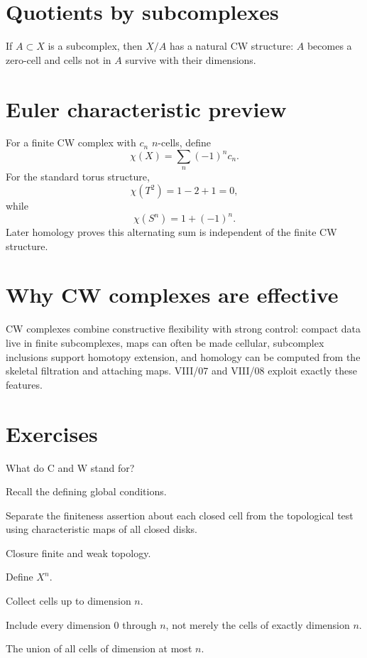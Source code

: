 \section{Quotients by subcomplexes}
\begin{proposition}[CW quotient]\label{prop:viii06-quotient}
If \(A\subset X\) is a subcomplex, then \(X/A\) has a natural CW structure:
\(A\) becomes a zero-cell and cells not in \(A\) survive with their dimensions.
\end{proposition}

\section{Euler characteristic preview}
For a finite CW complex with \(c_n\) \(n\)-cells, define
\[
\chi(X)=\sum_n(-1)^n c_n.
\]
For the standard torus structure,
\[
\chi(T^2)=1-2+1=0,
\]
while
\[
\chi(S^n)=1+(-1)^n.
\]
Later homology proves this alternating sum is independent of the finite CW
structure.

\section{Why CW complexes are effective}
CW complexes combine constructive flexibility with strong control: compact
data live in finite subcomplexes, maps can often be made cellular, subcomplex
inclusions support homotopy extension, and homology can be computed from the
skeletal filtration and attaching maps.  VIII/07 and VIII/08 exploit exactly
these features.


\section{Exercises}

\begin{exercise}\label{exr:viii06-01}
What do C and W stand for?
\end{exercise}
\begin{hint}
Recall the defining global conditions.

Separate the finiteness assertion about each closed cell from the topological test using characteristic maps of all closed disks.
\end{hint}
\begin{solution}
Closure finite and weak topology.
\end{solution}

\begin{exercise}\label{exr:viii06-02}
Define \(X^n\).
\end{exercise}
\begin{hint}
Collect cells up to dimension \(n\).

Include every dimension \(0\) through \(n\), not merely the cells of exactly dimension \(n\).
\end{hint}
\begin{solution}
The union of all cells of dimension at most \(n\).
\end{solution}

